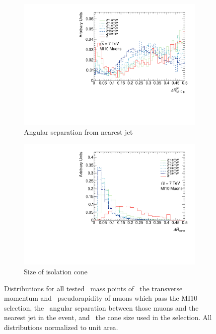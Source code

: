 \begin{figure}[htbp]
  \begin{subfigure}{0.48\textwidth}
    \includegraphics[width=\textwidth]{PartBoosted/Plots/h_mi10_jet_dr.pdf}
    \caption{Angular separation from nearest jet}\label{fig:BoostedControlMI10Dr}
  \end{subfigure}
  \begin{subfigure}{0.48\textwidth}
    \includegraphics[width=\textwidth]{PartBoosted/Plots/h_mi10_coneSize.pdf}
    \caption{Size of isolation cone}\label{fig:BoostedControlMI10Cone}
  \end{subfigure}

  \caption[Distributions for all tested \Zprime\ mass points of the transverse momentum and pseudorapidity of muons which pass the MI10 selection, the angular separation between those muons and the nearest jet in the event, and the cone size used in the selection.]{Distributions for all tested \Zprime\ mass points of~ the transverse momentum and~ pseudorapidity of muons which pass the MI10 selection, the~ angular separation between those muons and the nearest jet in the event, and~ the cone size used in the selection. All distributions normalized to unit area.}\label{fig:BoostedControlMI10}
\end{figure}

